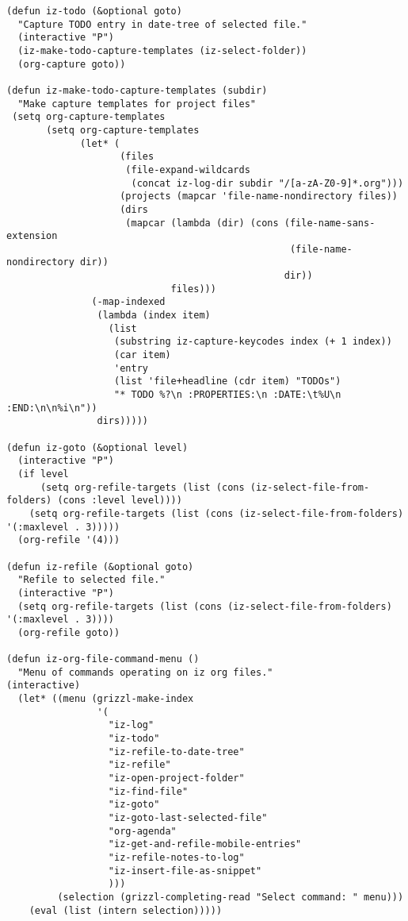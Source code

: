 \documentclass[10pt]{article}
\begin{document}
\begin{verbatim}
(defun iz-todo (&optional goto)
  "Capture TODO entry in date-tree of selected file."
  (interactive "P")
  (iz-make-todo-capture-templates (iz-select-folder))
  (org-capture goto))

(defun iz-make-todo-capture-templates (subdir)
  "Make capture templates for project files"
 (setq org-capture-templates
       (setq org-capture-templates
             (let* (
                    (files
                     (file-expand-wildcards
                      (concat iz-log-dir subdir "/[a-zA-Z0-9]*.org")))
                    (projects (mapcar 'file-name-nondirectory files))
                    (dirs
                     (mapcar (lambda (dir) (cons (file-name-sans-extension
                                                  (file-name-nondirectory dir))
                                                 dir))
                             files)))
               (-map-indexed
                (lambda (index item)
                  (list
                   (substring iz-capture-keycodes index (+ 1 index))
                   (car item)
                   'entry
                   (list 'file+headline (cdr item) "TODOs")
                   "* TODO %?\n :PROPERTIES:\n :DATE:\t%U\n :END:\n\n%i\n"))
                dirs)))))

(defun iz-goto (&optional level)
  (interactive "P")
  (if level
      (setq org-refile-targets (list (cons (iz-select-file-from-folders) (cons :level level))))
    (setq org-refile-targets (list (cons (iz-select-file-from-folders) '(:maxlevel . 3)))))
  (org-refile '(4)))

(defun iz-refile (&optional goto)
  "Refile to selected file."
  (interactive "P")
  (setq org-refile-targets (list (cons (iz-select-file-from-folders) '(:maxlevel . 3))))
  (org-refile goto))

(defun iz-org-file-command-menu ()
  "Menu of commands operating on iz org files."
(interactive)
  (let* ((menu (grizzl-make-index
                '(
                  "iz-log"
                  "iz-todo"
                  "iz-refile-to-date-tree"
                  "iz-refile"
                  "iz-open-project-folder"
                  "iz-find-file"
                  "iz-goto"
                  "iz-goto-last-selected-file"
                  "org-agenda"
                  "iz-get-and-refile-mobile-entries"
                  "iz-refile-notes-to-log"
                  "iz-insert-file-as-snippet"
                  )))
         (selection (grizzl-completing-read "Select command: " menu)))
    (eval (list (intern selection)))))


\end{verbatim}
\end{document}
